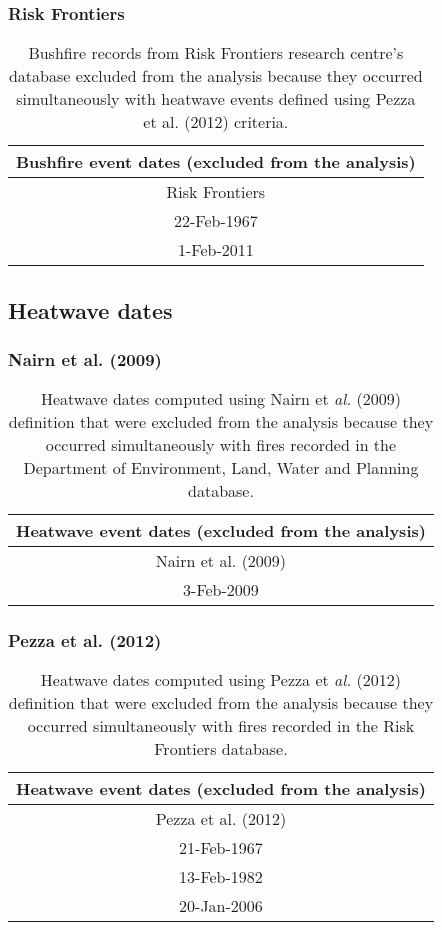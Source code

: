 \subsubsection{Risk Frontiers }

\begin{table}[H]
\caption{Bushfire records from Risk Frontiers research centre's database excluded
from the analysis because they occurred simultaneously with heatwave
events defined using Pezza et al. (2012) criteria. }


\centering{}%
\begin{tabular}{|c|}
\hline 
\textbf{Bushfire event dates (excluded from the analysis)}\tabularnewline
\hline 
\hline 
Risk Frontiers\tabularnewline
\hline 
22-Feb-1967\tabularnewline
\hline 
1-Feb-2011\tabularnewline
\hline 
\end{tabular}
\end{table}



\subsection{Heatwave dates}


\subsubsection{Nairn et al. (2009) }

\begin{table}[H]
\caption{Heatwave dates computed using Nairn et \textit{al.} (2009) definition
that were excluded from the analysis because they occurred simultaneously
with fires recorded in the Department of Environment, Land, Water
and Planning database. }


\centering{}%
\begin{tabular}{|c|}
\hline 
\textbf{Heatwave event dates (excluded from the analysis)}\tabularnewline
\hline 
\hline 
Nairn et al. (2009)\tabularnewline
\hline 
3-Feb-2009\tabularnewline
\hline 
\end{tabular}
\end{table}



\subsubsection{Pezza et al. (2012)}

\begin{table}[H]
\caption{Heatwave dates computed using Pezza et \textit{al.} (2012) definition
that were excluded from the analysis because they occurred simultaneously
with fires recorded in the Risk Frontiers database. }


\centering{}%
\begin{tabular}{|c|}
\hline 
\textbf{Heatwave event dates (excluded from the analysis)}\tabularnewline
\hline 
\hline 
Pezza et al. (2012)\tabularnewline
\hline 
21-Feb-1967\tabularnewline
\hline 
13-Feb-1982\tabularnewline
\hline 
20-Jan-2006\tabularnewline
\hline 
\end{tabular}
\end{table}



